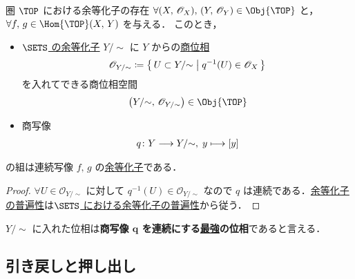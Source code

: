 \documentclass[geometry_main]{subfiles}
\begin{document}
\begin{myprop}[label=prop:coequalizer-top]{圏 $\TOP$ における余等化子の存在}
	$\forall (X,\, \mathscr{O}_X),\, (Y,\, \mathscr{O}_Y) \in \Obj{\TOP}$ と，$\forall f,\, g \in \Hom{\TOP}(X,\, Y)$ を与える．
	このとき，
	\begin{itemize}
		\item \hyperref[prop:coequalizer-sets]{$\SETS$ の余等化子} $Y/{\sim}$ に $Y$ からの\hyperref[def.quotopo]{商位相}
		\begin{align}
			\mathscr{O}_{Y/{\sim}} \coloneqq \bigl\{\, U \subset Y/{\sim} \bigm| q^{-1}(U) \in \mathscr{O}_X \,\bigr\} 
		\end{align}
		を入れてできる商位相空間
		\begin{align}
			\bigl( Y/{\sim},\, \mathscr{O}_{Y/{\sim}} \bigr) \in \Obj{\TOP}
		\end{align}
		\item 商写像
		\begin{align}
			q \colon Y \longrightarrow Y/{\sim},\; y \longmapsto [y]
		\end{align}
	\end{itemize}
	の組は連続写像 $f,\, g$ の\hyperref[def:coequalizer]{余等化子}である．
\end{myprop}

\begin{proof}
	$\forall U \in \mathscr{O}_{Y/{\sim}}$ に対して $q^{-1}(U) \in \mathscr{O}_{Y/{\sim}}$ なので $q$ は連続である．\hyperref[def:coequalizer]{余等化子の普遍性}は\hyperref[prop:coequalizer-sets]{$\SETS$ における余等化子の普遍性}から従う．
\end{proof}

\begin{marker}\label{remark:coequalizer}
	$Y/{\sim}$ に入れた位相は\textbf{商写像 $\bm{q}$ を連続にする\hyperref[def.intensity_topo]{最強}の位相}であると言える．
\end{marker}


\subsection{引き戻しと押し出し}
\end{document}
